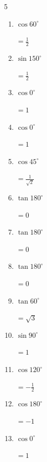 \begin{multicols}{5}
\begin{enumerate}
        $\displaystyle =\frac{1}{\sqrt{2}}$

  \item $\displaystyle \cos{60^\circ}$

        $\displaystyle =\frac{1}{2}$

  \item $\displaystyle \sin{150^\circ}$

        $\displaystyle =\frac{1}{2}$

  \item $\displaystyle \cos{0^\circ}$

        $\displaystyle =1$

  \item $\displaystyle \cos{0^\circ}$

        $\displaystyle =1$

  \item $\displaystyle \cos{45^\circ}$

        $\displaystyle =\frac{1}{\sqrt{2}}$

\columnbreak %

  \item $\displaystyle \tan{180^\circ}$

        $\displaystyle =0$

  \item $\displaystyle \tan{180^\circ}$

        $\displaystyle =0$

  \item $\displaystyle \tan{180^\circ}$

        $\displaystyle =0$

  \item $\displaystyle \tan{60^\circ}$

        $\displaystyle =\sqrt{3}$

  \item $\displaystyle \sin{90^\circ}$

        $\displaystyle =1$

  \item $\displaystyle \cos{120^\circ}$

        $\displaystyle =-\frac{1}{2}$

  \item $\displaystyle \cos{180^\circ}$

        $\displaystyle =-1$

  \item $\displaystyle \cos{0^\circ}$

        $\displaystyle =1$


\end{enumerate}
\end{multicols}
